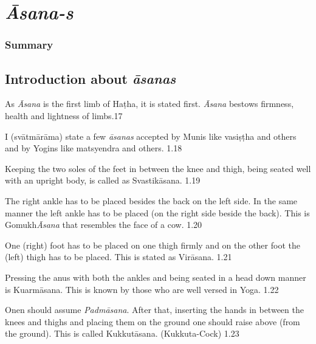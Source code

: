 \chapter{\textit{Āsana-s}}

\subsection*{Summary}

\section*{Introduction about \textit{āsanas}}

As \textit{Āsana} is the first limb of Haṭha, it is stated first. \textit{Āsana} bestows firmness, health and lightness of limbs.17 

I (svātmārāma) state a few \textit{āsanas} accepted by Munis like vasiṣṭha and others and by Yogins like matsyendra and others.  1.18


Keeping the two soles of the feet in between the knee and thigh, being seated well with an upright body, is called as Svastikāsana.  1.19


The right ankle has to be placed besides the back on the left side. In the same manner the left ankle has to be placed (on the right side beside the back). This is Gomukh\textit{Āsana} that resembles the face of a cow. 1.20


One (right) foot has to be placed on one thigh firmly and on the other foot the (left) thigh has to be placed. This is stated as Virāsana. 1.21


Pressing the anus with both the ankles and being seated in a head down manner is Kuarmāsana. This is known by those who are well versed in Yoga. 1.22


Onen should assume \textit{Padmāsana}. After that, inserting the hands in between the knees and thighs and placing them on the ground one should raise above (from the ground). This is called Kukkutāsana. (Kukkuta-Cock) 1.23


